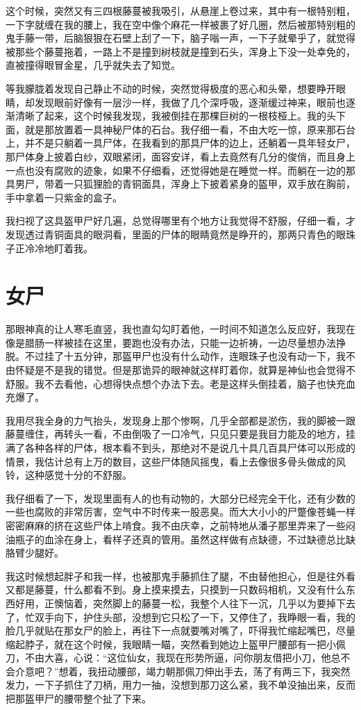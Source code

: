 这个时候，突然又有三四根藤蔓被我吸引，从悬崖上卷过来，其中有一根特别粗，一下字就缠在我的腰上，我在空中像个麻花一样被裹了好几圈，然后被那特别粗的鬼手藤一带，后脑狠狠在石壁上刮了一下，脑子嗡一声，一下子就晕乎了，就觉得被那些个藤蔓拖着，一路上不是撞到树枝就是撞到石头，浑身上下没一处幸免的，直被撞得眼冒金星，几乎就失去了知觉。

等我朦胧着发现自己静止不动的时候，突然觉得极度的恶心和头晕，想要睁开眼睛，却发现眼前好像有一层沙一样，我做了几个深呼吸，逐渐缓过神来，眼前也逐渐清晰了起来，这个时候我发现，我被倒挂在那棵巨树的一根枝桠上。我的头下面，就是那放置着一具神秘尸体的石台。我仔细一看，不由大吃一惊，原来那石台上，并不是只躺着一具尸体，在我看到的那具尸体的边上，还躺着一具年轻女尸，那尸体身上披着白纱，双眼紧闭，面容安详，看上去竟然有几分的俊俏，而且身上一点也没有腐败的迹象，如果不仔细看，还觉得她是在睡觉一样。而躺在一边的那具男尸，带着一只狐狸脸的青铜面具，浑身上下披着紧身的盔甲，双手放在胸前，手中拿着一只紫金的盒子。

我扫视了这具盔甲尸好几遍，总觉得哪里有个地方让我觉得不舒服，仔细一看，才发现透过青铜面具的眼洞看，里面的尸体的眼睛竟然是睁开的，那两只青色的眼珠子正冷冷地盯着我。

\chapter{女尸}

那眼神真的让人寒毛直竖，我也直勾勾盯着他，一时间不知道怎么反应好，我现在像是腊肠一样被挂在这里，要跑也没有办法，只能一边祈祷，一边尽量想办法挣脱。不过挂了十五分钟，那盔甲尸也没有什么动作，连眼珠子也没有动一下，我不由怀疑是不是我的错觉。但是那诡异的眼神就这样盯着你，就算是神仙也会觉得不舒服。我不去看他，心想得快点想个办法下去。老是这样头倒挂着，脑子也快充血充爆了。

我用尽我全身的力气抬头，发现身上那个惨啊，几乎全部都是淤伤，我的脚被一跟藤蔓缠住，再转头一看，不由倒吸了一口冷气，只见只要是我目力能及的地方，挂满了各种各样的尸体，根本看不到头，那绝对不是说几十具几百具尸体可以形成的情景，我估计总有上万的数目，这些尸体随风摇曳，看上去像很多骨头做成的风铃，这种感觉十分的不舒服。

我仔细看了一下，发现里面有人的也有动物的，大部分已经完全干化，还有少数的一些也腐败的非常厉害，空气中不时传来一股恶臭。而大大小小的尸蹩像苍蝇一样密密麻麻的挤在这些尸体上啃食。我不由庆幸，之前特地从潘子那里弄来了一些闷油瓶子的血涂在身上，看样子还真的管用。虽然这样做有点缺德，不过缺德总比缺胳臂少腿好。

我这时候想起胖子和我一样，也被那鬼手藤抓住了腿，不由替他担心，但是往外看又都是藤蔓，什么都看不到。身上摸来摸去，只摸到一只数码相机，又没有什么东西好用，正懊恼着，突然脚上的藤蔓一松，我整个人往下一沉，几乎以为要掉下去了，忙双手向下，护住头部，没想到它只松了一下，又停住了，我睁眼一看，我的脸几乎就贴在那女尸的脸上，再往下一点就要嘴对嘴了，吓得我忙缩起嘴巴，尽量缩起脖子，就在这个时候，我眼睛一瞄，突然看到她边上盔甲尸腰部有一把小佩刀，不由大喜，心说：“这位仙女，我现在形势所逼，问你朋友借把小刀，他总不会介意吧？”想着，我扭动腰部，竭力朝那佩刀伸出手去，荡了有两三下，我突然发力，一下子抓住了刀柄，用力一抽，没想到那刀这么紧，我不单没抽出来，反而把那盔甲尸的腰带整个扯了下来。

